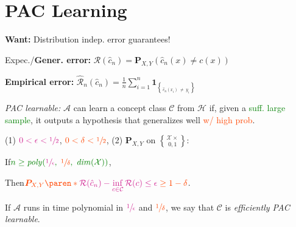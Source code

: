 \section{PAC Learning}

\begin{highlightbox}
    \textbf{Want:} Distribution indep. error guarantees!
\end{highlightbox}

Expec./\textbf{Gener. error:}\enskip
$\mathcal R(\hat c_n) = \bm P_{X,Y}(\hat c_n(x) \neq c(x))$

\textbf{Empirical error:}\enskip
$\hat{\mathcal R}_n(\hat c_n) = \frac1n \sum_{i=1}^n \bm 1_{\brace{\hat c_n(x_i) \;\neq\; y_i}}$


\emph{PAC learnable:} $\mathcal A$ can learn a concept class $\mathcal C$ from $\mathcal H$ if, given a \textcolor{Green}{suff. large sample}, it outputs a hypothesis that \textcolor{VioletRed}{generalizes well} \textcolor{OrangeRed}{w/ high prob}.

\begin{highlightbox}
\vspace{-\fboxrule}\vspace{-\fboxsep}
    \begin{highlightbox}[white]
        (1) $\color{VioletRed} 0 < \epsilon < \sfrac12$, $\color{OrangeRed} 0 < \delta < \sfrac12$,
        (2) $\bm P_{X,Y}$ on $\mathcal X \times \brace{0,1}$:
        
        If\enskip $\color{Green} n \geq \mathit{poly} (\textcolor{VioletRed}{\sfrac1\epsilon},\; \textcolor{OrangeRed}{\sfrac1\delta},\; \mathit{dim}(\mathcal X))$,
        
        Then\enskip $\color{OrangeRed} \bm P_{X,Y}
        \paren*{ \color{VioletRed}
            \mathcal R(\hat c_n) - \inf\limits_{c\in\mathcal C} \mathcal R(c) \leq \epsilon
        } \geq 1 - \delta$.
    \end{highlightbox}%
\vspace{-\fboxrule}\vspace{-\fboxsep}
\end{highlightbox}

If $\mathcal A$ runs in time polynomial in $\color{VioletRed} \sfrac1\epsilon$ and $\color{OrangeRed} \sfrac1\delta$, we say that $\mathcal C$ is \emph{efficiently PAC learnable}.

